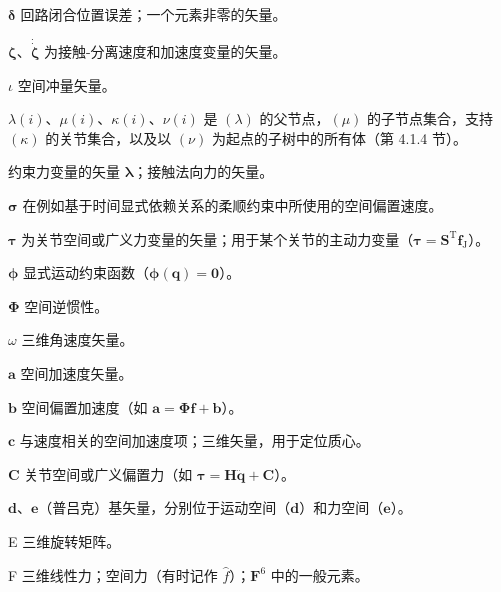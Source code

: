 \documentclass[10pt,a4paper]{book}
\theoremstyle{thmstyle} %
\theoremstyle{defstyle} %
\theoremstyle{prostyle} %
\begin{document}
$\boldsymbol{\delta}$ 回路闭合位置误差；一个元素非零的矢量。



$\boldsymbol{\zeta}$、$\dot{\dot{\boldsymbol{\zeta}}}$ 为接触-分离速度和加速度变量的矢量。



$\iota$ 空间冲量矢量。



$\lambda(i)$、$\mu(i)$、$\kappa(i)$、$\nu(i)$ 是 $(\lambda)$ 的父节点，$(\mu)$ 的子节点集合，支持 $(\kappa)$ 的关节集合，以及以 $(\nu)$ 为起点的子树中的所有体（第 4.1.4 节）。



约束力变量的矢量 $\boldsymbol{\lambda}$；接触法向力的矢量。



$\boldsymbol{\sigma}$ 在例如基于时间显式依赖关系的柔顺约束中所使用的空间偏置速度。



$\boldsymbol{\tau}$ 为关节空间或广义力变量的矢量；用于某个关节的主动力变量（$\boldsymbol{\tau}=\boldsymbol{S}^{\mathrm{T}}\boldsymbol{f}_{\mathrm{J}}$）。



$\boldsymbol{\phi}$ 显式运动约束函数（$\boldsymbol{\phi}(\boldsymbol{q})=\boldsymbol{0}$）。



$\boldsymbol{\Phi}$ 空间逆惯性。



$\omega$ 三维角速度矢量。



$\boldsymbol{a}$ 空间加速度矢量。



$\boldsymbol{b}$ 空间偏置加速度（如 $\boldsymbol{a}=\boldsymbol{\Phi}\boldsymbol{f}+\boldsymbol{b}$）。



$\boldsymbol{c}$ 与速度相关的空间加速度项；三维矢量，用于定位质心。



$\boldsymbol{C}$ 关节空间或广义偏置力（如 $\boldsymbol{\tau}=\boldsymbol{H}\ddot{\boldsymbol{q}}+\boldsymbol{C}$）。



$\boldsymbol{d}$、$\boldsymbol{e}$（普吕克）基矢量，分别位于运动空间（$\boldsymbol{d}$）和力空间（$\boldsymbol{e}$）。



E 三维旋转矩阵。



F 三维线性力；空间力（有时记作 $\hat{f}$）；$\mathbf{F}^{6}$ 中的一般元素。
\end{document}
